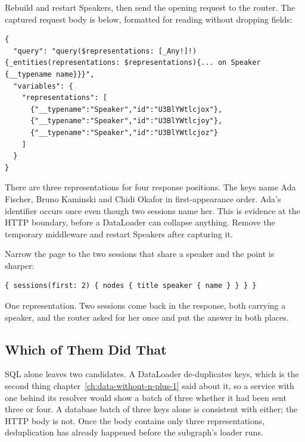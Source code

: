 Rebuild and restart Speakers, then send the opening 
request to the router. The captured request body is below, formatted for
reading without dropping fields:

\begin{verbatim}
{
  "query": "query($representations: [_Any!]!){_entities(representations: $representations){... on Speaker {__typename name}}}",
  "variables": {
    "representations": [
      {"__typename":"Speaker","id":"U3BlYWtlcjox"},
      {"__typename":"Speaker","id":"U3BlYWtlcjoy"},
      {"__typename":"Speaker","id":"U3BlYWtlcjoz"}
    ]
  }
}
\end{verbatim}

There are three representations for four response positions. The keys name
Ada Fischer, Bruno Kaminski and Chidi Okafor in first-appearance order.
Ada's identifier occurs once even though two sessions name her. This is
evidence at the HTTP boundary, before a DataLoader can collapse anything.
Remove the temporary middleware and restart Speakers after capturing it.

%
Narrow the page to the two sessions that share a speaker and the point is
sharper:

\begin{verbatim}
{ sessions(first: 2) { nodes { title speaker { name } } } }
\end{verbatim}

%
One representation. Two sessions come back in the response, both carrying a
speaker, and the router asked for her once and put the answer in both places.

\subsection{Which of Them Did That}

%
SQL alone leaves two candidates. A DataLoader
de-duplicates keys, which is the second thing
chapter~\ref{ch:data-without-n-plus-1} said about it, so a service with one
behind its resolver would show a batch of three whether it had been sent three
or four. A database batch of three keys alone is consistent with either;
the HTTP body is not. Once the body contains only three representations,
deduplication has already happened before the subgraph's loader runs.

